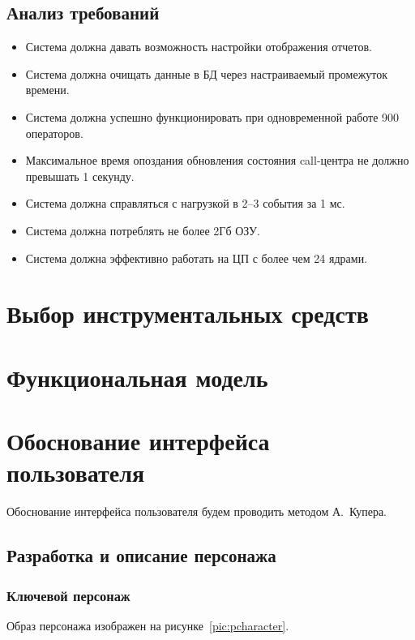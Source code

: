 \subsection{Анализ требований}

\begin{itemize}
    \item Система должна давать возможность настройки отображения отчетов.
    \item Система должна очищать данные в БД через настраиваемый промежуток времени.
    \item Система должна успешно функционировать при одновременной работе 900 операторов.
    \item Максимальное время опоздания обновления состояния call-центра не должно превышать 1 секунду.
    \item Система должна справляться с нагрузкой в 2--3 события за 1 мс.
    \item Система должна потреблять не более 2Гб ОЗУ.
    \item Система должна эффективно работать на ЦП с более чем 24 ядрами.
\end{itemize}

\section{Выбор инструментальных средств}

\section{Функциональная модель}

\section{Обоснование интерфейса пользователя}

Обоснование интерфейса пользователя будем проводить методом А.~Купера. %

\subsection{Разработка и описание персонажа}

\subsubsection{Ключевой персонаж}

Образ персонажа изображен на рисунке~\ref{pic:pcharacter}.

